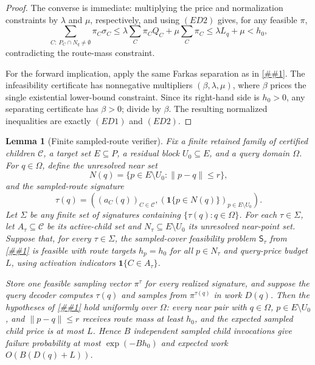\documentclass[10pt]{article}
\newcommand{\cref}[1]{\ref{##1}}
\newtheorem{lemma}[theorem]{Lemma}
\theoremstyle{definition}
\begin{document}
\begin{proof}
   The converse is immediate: multiplying the price and normalization
   constraints by \(\lambda\) and \(\mu\), respectively, and using \((ED2)\)
   gives, for any feasible \(\pi\),
   \[
      \sum_{C:\ P_C\cap N_q\ne\emptyset}\pi_C\sigma_C
      \le
      \lambda\sum_C\pi_CQ_C+\mu\sum_C\pi_C
      \le
      \lambda L_q+\mu
      <
      h_0,
   \]
   contradicting the route-mass constraint.

   For the forward implication, apply the same Farkas separation as in
   \cref{lem:finite-sampled-cover-dual}.  The infeasibility certificate has
   nonnegative multipliers \((\beta,\lambda,\mu)\), where \(\beta\) prices the
   single existential lower-bound constraint.  Since its right-hand side is
   \(h_0>0\), any separating certificate has \(\beta>0\); divide by \(\beta\).
   The resulting normalized inequalities are exactly \((ED1)\) and \((ED2)\).
\end{proof}

\begin{lemma}[Finite sampled-route verifier]
   \label{lem:finite-sampled-route-verifier}
   Fix a finite retained family of certified children $\mathcal C$, a target
   set $E\subseteq P$, a residual block $U_0\subseteq E$, and a query domain
   $\Omega$.  For $q\in\Omega$, define the unresolved near set
   \[
      N(q)=\{p\in E\setminus U_0:\|p-q\|\le r\},
   \]
   and the sampled-route signature
   \[
      \tau(q)=
      \left(
         (a_C(q))_{C\in\mathcal C},
         (\mathbf 1\{p\in N(q)\})_{p\in E\setminus U_0}
      \right).
   \]
   Let $\Sigma$ be any finite set of signatures containing
   $\{\tau(q):q\in\Omega\}$.  For each $\tau\in\Sigma$, let
   $A_\tau\subseteq\mathcal C$ be its active-child set and
   $N_\tau\subseteq E\setminus U_0$ its unresolved near-point set.  Suppose
   that, for every $\tau\in\Sigma$, the sampled-cover feasibility problem
   \(\mathsf S_\tau\) from \cref{lem:finite-sampled-cover-dual} is feasible
   with route targets $h_p=h_0$ for all $p\in N_\tau$ and query-price budget
   $L$, using activation indicators $\mathbf 1\{C\in A_\tau\}$.

   Store one feasible sampling vector $\pi^\tau$ for every realized signature,
   and suppose the query decoder computes $\tau(q)$ and samples from
   $\pi^{\tau(q)}$ in work $D(q)$.  Then the hypotheses of
   \cref{lem:sampled-priced-cover} hold uniformly over $\Omega$: every near
   pair with $q\in\Omega$, $p\in E\setminus U_0$, and $\|p-q\|\le r$ receives
   route mass at least $h_0$, and the expected sampled child price is at most
   $L$.  Hence $B$ independent sampled child invocations give failure
   probability at most $\exp(-Bh_0)$ and expected work
   $O(B(D(q)+L))$.
\end{lemma}
\end{document}
